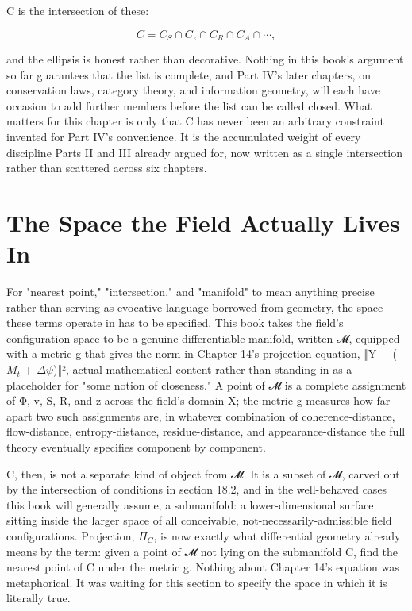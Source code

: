 C is the intersection of these:

\[ C = C_S \cap C_z \cap C_R \cap C_A \cap \cdots, \]

and the ellipsis is honest rather than decorative. Nothing in this book's argument so far guarantees that the list is complete, and Part IV's later chapters, on conservation laws, category theory, and information geometry, will each have occasion to add further members before the list can be called closed. What matters for this chapter is only that C has never been an arbitrary constraint invented for Part IV's convenience. It is the accumulated weight of every discipline Parts II and III already argued for, now written as a single intersection rather than scattered across six chapters.

\section{The Space the Field Actually Lives In}

For "nearest point," "intersection," and "manifold" to mean anything precise rather than serving as evocative language borrowed from geometry, the space these terms operate in has to be specified. This book takes the field's configuration space to be a genuine differentiable manifold, written 𝓜, equipped with a metric g that gives the norm in Chapter 14's projection equation, ‖Y − (\(M_t\) + \(\Delta\psi\))‖², actual mathematical content rather than standing in as a placeholder for "some notion of closeness." A point of 𝓜 is a complete assignment of Φ, v, S, R, and z across the field's domain X; the metric g measures how far apart two such assignments are, in whatever combination of coherence-distance, flow-distance, entropy-distance, residue-distance, and appearance-distance the full theory eventually specifies component by component.

C, then, is not a separate kind of object from 𝓜. It is a subset of 𝓜, carved out by the intersection of conditions in section 18.2, and in the well-behaved cases this book will generally assume, a submanifold: a lower-dimensional surface sitting inside the larger space of all conceivable, not-necessarily-admissible field configurations. Projection, \(\Pi_C\), is now exactly what differential geometry already means by the term: given a point of 𝓜 not lying on the submanifold C, find the nearest point of C under the metric g. Nothing about Chapter 14's equation was metaphorical. It was waiting for this section to specify the space in which it is literally true.

